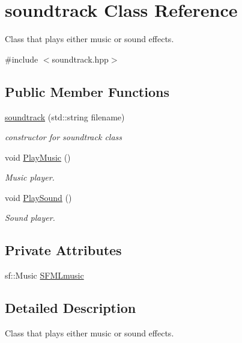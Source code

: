\hypertarget{classsoundtrack}{}\section{soundtrack Class Reference}
\label{classsoundtrack}


Class that plays either music or sound effects.  




{\ttfamily \#include $<$soundtrack.\+hpp$>$}

\subsection*{Public Member Functions}
\begin{DoxyCompactItemize}
\item 
\hyperlink{classsoundtrack_add31bdeb1a693d541443f1d88586d3b6}{soundtrack} (std\+::string filename)
\begin{DoxyCompactList}\small\item\em constructor for soundtrack class \end{DoxyCompactList}\item 
void \hyperlink{classsoundtrack_a9bc49316f0c8607aef388728d2ca28db}{Play\+Music} ()
\begin{DoxyCompactList}\small\item\em Music player. \end{DoxyCompactList}\item 
void \hyperlink{classsoundtrack_a3c86452d68b41eea981d0df4984713e8}{Play\+Sound} ()
\begin{DoxyCompactList}\small\item\em Sound player. \end{DoxyCompactList}\end{DoxyCompactItemize}
\subsection*{Private Attributes}
\begin{DoxyCompactItemize}
\item 
sf\+::\+Music \hyperlink{classsoundtrack_ae1db63c6fe8c2f2111c693bd543e921c}{S\+F\+M\+Lmusic}
\end{DoxyCompactItemize}


\subsection{Detailed Description}
Class that plays either music or sound effects. 

